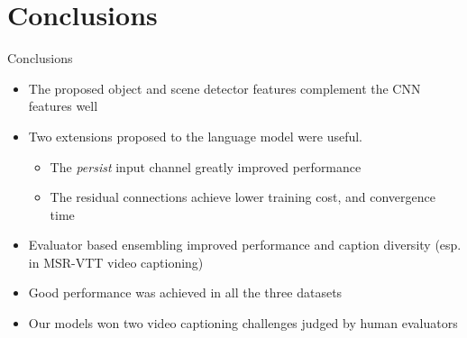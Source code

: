 \documentclass{beamer}
\newcommand{\mcCell}[1]{\multicolumn{1}{|c|}{#1}}
\begin{document}
\section{Conclusions}
\begin{frame}{Conclusions}
\begin{itemize}
    \item The proposed object and scene detector features complement the CNN features well 
    \item Two extensions proposed to the language model were useful. 
       \begin{itemize}
           \item The \emph{persist} input channel greatly improved performance
           \item The residual connections achieve lower training cost, and convergence time
       \end{itemize}
    \item Evaluator based ensembling improved performance and caption diversity (esp. in MSR-VTT video captioning)
    \item Good performance was achieved in all the three datasets
    \item Our models won two video captioning challenges judged by human evaluators 
\end{itemize}
\end{frame}
\end{document}
